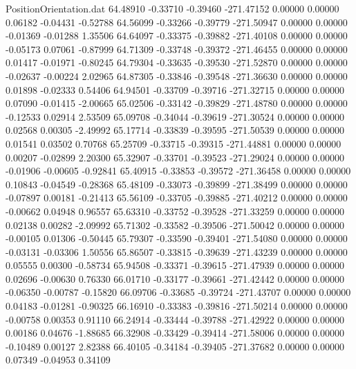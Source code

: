 \begin{filecontents}{PositionOrientation.dat}
  64.48910   -0.33710   -0.39460  -271.47152    0.00000    0.00000    0.06182   -0.04431   -0.52788
  64.56099   -0.33266   -0.39779  -271.50947    0.00000    0.00000   -0.01369   -0.01288    1.35506
  64.64097   -0.33375   -0.39882  -271.40108    0.00000    0.00000   -0.05173    0.07061   -0.87999
  64.71309   -0.33748   -0.39372  -271.46455    0.00000    0.00000    0.01417   -0.01971   -0.80245
  64.79304   -0.33635   -0.39530  -271.52870    0.00000    0.00000   -0.02637   -0.00224    2.02965
  64.87305   -0.33846   -0.39548  -271.36630    0.00000    0.00000    0.01898   -0.02333    0.54406
  64.94501   -0.33709   -0.39716  -271.32715    0.00000    0.00000    0.07090   -0.01415   -2.00665
  65.02506   -0.33142   -0.39829  -271.48780    0.00000    0.00000   -0.12533    0.02914    2.53509
  65.09708   -0.34044   -0.39619  -271.30524    0.00000    0.00000    0.02568    0.00305   -2.49992
  65.17714   -0.33839   -0.39595  -271.50539    0.00000    0.00000    0.01541    0.03502    0.70768
  65.25709   -0.33715   -0.39315  -271.44881    0.00000    0.00000    0.00207   -0.02899    2.20300
  65.32907   -0.33701   -0.39523  -271.29024    0.00000    0.00000   -0.01906   -0.00605   -0.92841
  65.40915   -0.33853   -0.39572  -271.36458    0.00000    0.00000    0.10843   -0.04549   -0.28368
  65.48109   -0.33073   -0.39899  -271.38499    0.00000    0.00000   -0.07897    0.00181   -0.21413
  65.56109   -0.33705   -0.39885  -271.40212    0.00000    0.00000   -0.00662    0.04948    0.96557
  65.63310   -0.33752   -0.39528  -271.33259    0.00000    0.00000    0.02138    0.00282   -2.09992
  65.71302   -0.33582   -0.39506  -271.50042    0.00000    0.00000   -0.00105    0.01306   -0.50445
  65.79307   -0.33590   -0.39401  -271.54080    0.00000    0.00000   -0.03131   -0.03306    1.50556
  65.86507   -0.33815   -0.39639  -271.43239    0.00000    0.00000    0.05555    0.00300   -0.58734
  65.94508   -0.33371   -0.39615  -271.47939    0.00000    0.00000    0.02696   -0.00630    0.76330
  66.01710   -0.33177   -0.39661  -271.42442    0.00000    0.00000   -0.06350   -0.00787   -0.15820
  66.09706   -0.33685   -0.39724  -271.43707    0.00000    0.00000    0.04183   -0.01281   -0.90325
  66.16910   -0.33383   -0.39816  -271.50214    0.00000    0.00000   -0.00758    0.00353    0.91110
  66.24914   -0.33444   -0.39788  -271.42922    0.00000    0.00000    0.00186    0.04676   -1.88685
  66.32908   -0.33429   -0.39414  -271.58006    0.00000    0.00000   -0.10489    0.00127    2.82388
  66.40105   -0.34184   -0.39405  -271.37682    0.00000    0.00000    0.07349   -0.04953    0.34109

\end{filecontents}
